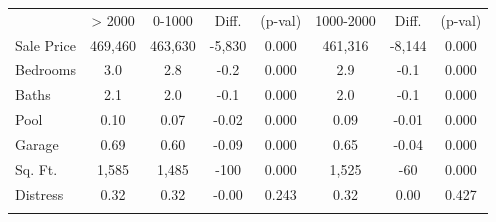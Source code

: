 \begin{center}
\begin{tabular}{lccccccc}
\hline \noalign{\smallskip} & > 2000 & 0-1000  & Diff. & (p-val) & 1000-2000 & Diff. & (p-val)\\
\noalign{\smallskip}\hline Sale Price & 469,460 & 463,630 & -5,830 & 0.000 & 461,316 & -8,144 & 0.000\\
Bedrooms & 3.0 & 2.8 & -0.2 & 0.000 & 2.9 & -0.1 & 0.000\\
Baths & 2.1 & 2.0 & -0.1 & 0.000 & 2.0 & -0.1 & 0.000\\
Pool & 0.10 & 0.07 & -0.02 & 0.000 & 0.09 & -0.01 & 0.000\\
Garage & 0.69 & 0.60 & -0.09 & 0.000 & 0.65 & -0.04 & 0.000\\
Sq. Ft. & 1,585 & 1,485 & -100 & 0.000 & 1,525 & -60 & 0.000\\
\noalign{\smallskip}Distress & 0.32 & 0.32 & -0.00 & 0.243 & 0.32 & 0.00 & 0.427\\
\noalign{\smallskip}\hline\end{tabular}\\
\end{center}
